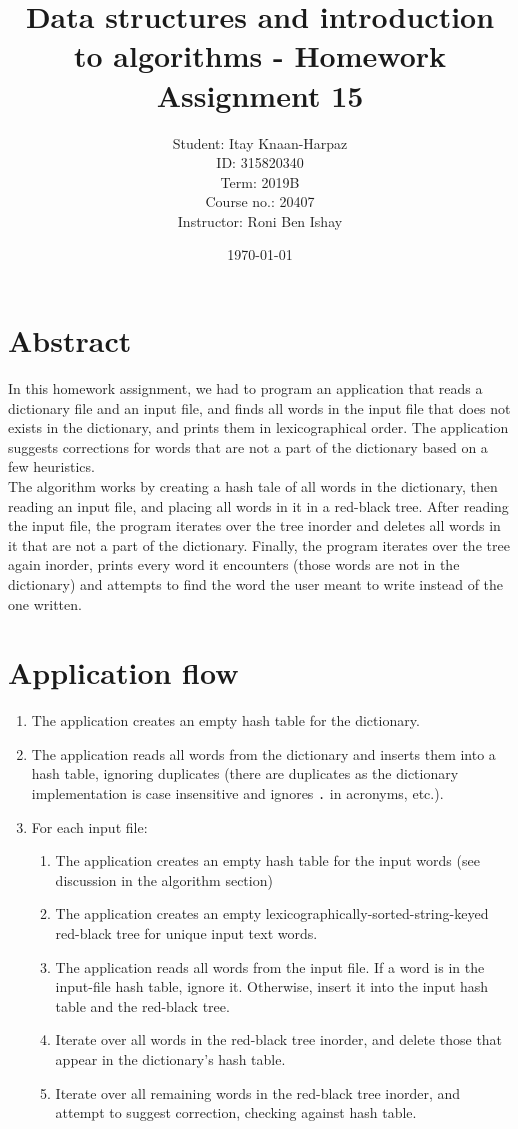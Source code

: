 \documentclass[a4paper]{article}
\title{Data structures and introduction to algorithms - Homework Assignment 15}
\author{Student: Itay Knaan-Harpaz\\ID: 315820340\\Term: 2019B\\Course no.: 20407\\Instructor: Roni Ben Ishay\\}
\date{\today}
\begin{document}
\maketitle

\section{Abstract}

In this homework assignment, we had to program an application that reads a dictionary file and an input file, and finds all words in the input file that does not exists in the dictionary, and prints them in lexicographical order. The application suggests corrections for words that are not a part of the dictionary based on a few heuristics.\\

The algorithm works by creating a hash tale of all words in the dictionary, then reading an input file, and placing all words in it in a red-black tree. After reading the input file, the program iterates over the tree inorder and deletes all words in it that are not a part of the dictionary. Finally, the program iterates over the tree again inorder, prints every word it encounters (those words are not in the dictionary) and attempts to find the word the user meant to write instead of the one written.\\

\section{Application flow}

\begin{enumerate}
	\item The application creates an empty hash table for the dictionary.
	\item The application reads all words from the dictionary and inserts them into a hash table, ignoring duplicates (there are duplicates as the dictionary implementation is case insensitive and ignores \texttt{.} in acronyms, etc.).
	\item For each input file:
	\begin{enumerate}
		\item The application creates an empty hash table for the input words (see discussion in the algorithm section)
		\item The application creates an empty lexicographically-sorted-string-keyed red-black tree for unique input text words.
		\item The application reads all words from the input file. If a word is in the input-file hash table, ignore it. Otherwise, insert it into the input hash table and the red-black tree.
		\item Iterate over all words in the red-black tree inorder, and delete those that appear in the dictionary's hash table.
		\item Iterate over all remaining words in the red-black tree inorder, and attempt to suggest correction, checking against hash table.
	\end{enumerate}
\end{enumerate}
\end{document}
